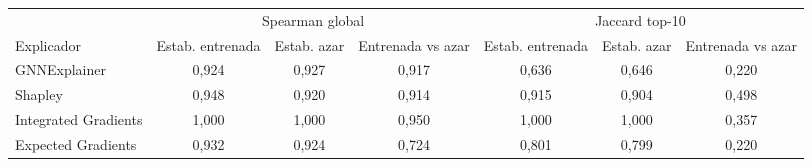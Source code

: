 \begin{tabular}{lcccccc}
\toprule
 & \multicolumn{3}{c}{Spearman global} & \multicolumn{3}{c}{Jaccard top-10} \\
\cmidrule(lr){2-4}\cmidrule(lr){5-7}
Explicador & Estab. entrenada & Estab. azar & Entrenada vs azar & Estab. entrenada & Estab. azar & Entrenada vs azar \\
\midrule
GNNExplainer & 0{,}924 & 0{,}927 & 0{,}917 & 0{,}636 & 0{,}646 & 0{,}220 \\
Shapley & 0{,}948 & 0{,}920 & 0{,}914 & 0{,}915 & 0{,}904 & 0{,}498 \\
Integrated Gradients & 1{,}000 & 1{,}000 & 0{,}950 & 1{,}000 & 1{,}000 & 0{,}357 \\
Expected Gradients & 0{,}932 & 0{,}924 & 0{,}724 & 0{,}801 & 0{,}799 & 0{,}220 \\
\bottomrule
\end{tabular}
